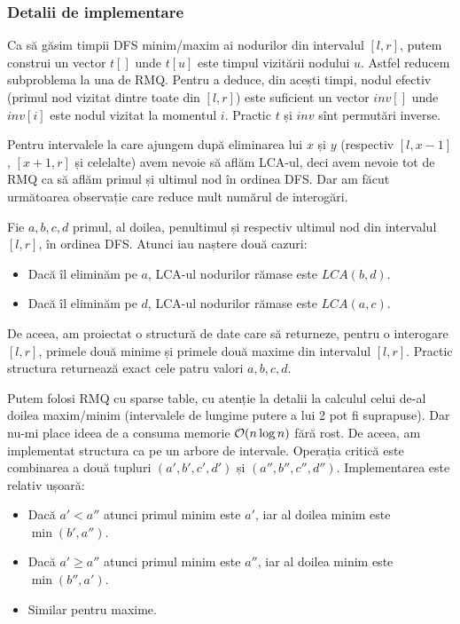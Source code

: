 \documentclass[../main.tex]{subfiles}
\begin{document}
\subsubsection*{Detalii de implementare}

Ca să găsim timpii DFS minim/maxim ai nodurilor din intervalul $[l,r]$, putem construi un vector $t[]$ unde $t[u]$ este timpul vizitării nodului $u$. Astfel reducem subproblema la una de RMQ. Pentru a deduce, din acești timpi, nodul efectiv (primul nod vizitat dintre toate din $[l,r]$) este suficient un vector $inv[]$ unde $inv[i]$ este nodul vizitat la momentul $i$. Practic $t$ și $inv$ sînt permutări inverse.

Pentru intervalele la care ajungem după eliminarea lui $x$ și $y$ (respectiv $[l,x-1]$, $[x+1,r]$ și celelalte) avem nevoie să aflăm LCA-ul, deci avem nevoie tot de RMQ ca să aflăm primul și ultimul nod în ordinea DFS. Dar am făcut următoarea observație care reduce mult numărul de interogări.

Fie $a,b,c,d$ primul, al doilea, penultimul și respectiv ultimul nod din intervalul $[l,r]$, în ordinea DFS. Atunci iau naștere două cazuri:

\begin{itemize}
  \item Dacă îl eliminăm pe $a$, LCA-ul nodurilor rămase este $LCA(b,d)$.
  \item Dacă îl eliminăm pe $d$, LCA-ul nodurilor rămase este $LCA(a,c)$.
\end{itemize}

De aceea, am proiectat o structură de date care să returneze, pentru o interogare $[l,r]$, primele două minime și primele două maxime din intervalul $[l,r]$. Practic structura returnează exact cele patru valori $a,b,c,d$.

Putem folosi RMQ cu sparse table, cu atenție la detalii la calculul celui de-al doilea maxim/minim (intervalele de lungime putere a lui 2 pot fi suprapuse). Dar nu-mi place ideea de a consuma memorie $\mathcal{O}(n \log n)$ fără rost.  De aceea, am implementat structura ca pe un arbore de intervale. Operația critică este combinarea a două tupluri $(a', b', c', d')$ și $(a'', b'', c'', d'')$. Implementarea este relativ ușoară:

\begin{itemize}
  \item Dacă $a' < a''$ atunci primul minim este $a'$, iar al doilea minim este $\min(b', a'')$.
  \item Dacă $a' \geq a''$ atunci primul minim este $a''$, iar al doilea minim este $\min(b'', a')$.
  \item Similar pentru maxime.
\end{itemize}
\end{document}
